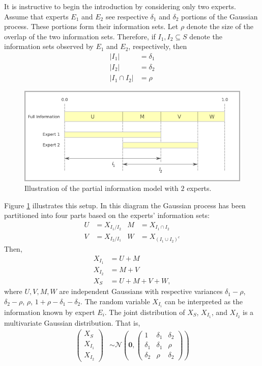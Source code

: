 \documentclass[11pt]{article}
\theoremstyle{definition}
\theoremstyle{definition}
\begin{document}
It is instructive to begin the introduction by considering only 
two experts.  Assume that experts $E_1$ and $E_2$ see respective 
$\delta_1$ and $\delta_2$ portions of the Gaussian process. 
These portions form their information sets.  Let $\rho$ denote
the size of the overlap of the two information sets.
Therefore, if $I_1, I_2 \subseteq S$ denote the information 
sets observed by $E_1$ and $E_2$, respectively, then
\begin{align*}
|I_1| &= \delta_1\\
|I_2| &= \delta_2\\
|I_1 \cap I_2| &= \rho
\end{align*}
\begin{figure}[htbp]
   \includegraphics[width = \textwidth]{N=2} %
   \caption{Illustration of the partial information model with $2$ experts.}
   \label{diagram2}
\end{figure}
Figure \ref{diagram2} illustrates this setup.  In this diagram the 
Gaussian process has been partitioned into four parts based on the 
experts' information sets:
\begin{align*}
 U &= X_{I_1 / I_2}
& M &= X_{I_1 \cap I_2}\\
 V &= X_{I_2 / I_1}
& W &= X_{(I_1 \cup I_2)^c}
\end{align*}
Then,
\begin{align*}
X_{I_1} &= U + M\\
X_{I_2} &= M + V\\
X_S &= U+M+V+W,
\end{align*}
where $U, V, M, W$ are independent Gaussians with respective variances 
$\delta_1-\rho$, $\delta_2-\rho$, $\rho$, $1+\rho-\delta_1 - \delta_2$. 
The random variable $X_{I_i}$ can be interpreted as the information 
known by expert $E_i$.  The joint distribution of $X_{S}$, $X_{I_1}$, 
and $X_{I_2}$ is a multivariate Gaussian distribution.  That is,
\begin{align}
\left(\begin{matrix} X_S \\ X_{I_1}\\ X_{I_2} \end{matrix}\right) 
 &\sim \mathcal{N}\left(
 \boldsymbol{0},  \left(\begin{matrix} 
1 & \delta_1 & \delta_2\\
\delta_1 & \delta_1 &\rho\\
\delta_2 & \rho & \delta_2
 \end{matrix}\right)\right) \label{twoExperts}
\end{align}
\end{document}
